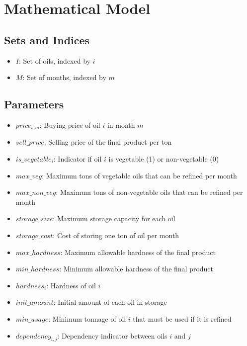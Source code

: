 \documentclass{article}
\begin{document}
\section*{Mathematical Model}

\subsection*{Sets and Indices}
\begin{itemize}
    \item \( I \): Set of oils, indexed by \( i \)
    \item \( M \): Set of months, indexed by \( m \)
\end{itemize}

\subsection*{Parameters}
\begin{itemize}
    \item \( price_{i,m} \): Buying price of oil \( i \) in month \( m \)
    \item \( sell\_price \): Selling price of the final product per ton
    \item \( is\_vegetable_{i} \): Indicator if oil \( i \) is vegetable (1) or non-vegetable (0)
    \item \( max\_veg \): Maximum tons of vegetable oils that can be refined per month
    \item \( max\_non\_veg \): Maximum tons of non-vegetable oils that can be refined per month
    \item \( storage\_size \): Maximum storage capacity for each oil
    \item \( storage\_cost \): Cost of storing one ton of oil per month
    \item \( max\_hardness \): Maximum allowable hardness of the final product
    \item \( min\_hardness \): Minimum allowable hardness of the final product
    \item \( hardness_{i} \): Hardness of oil \( i \)
    \item \( init\_amount \): Initial amount of each oil in storage
    \item \( min\_usage \): Minimum tonnage of oil \( i \) that must be used if it is refined
    \item \( dependency_{i, j} \): Dependency indicator between oils \( i \) and \( j \)
\end{itemize}
\end{document}
